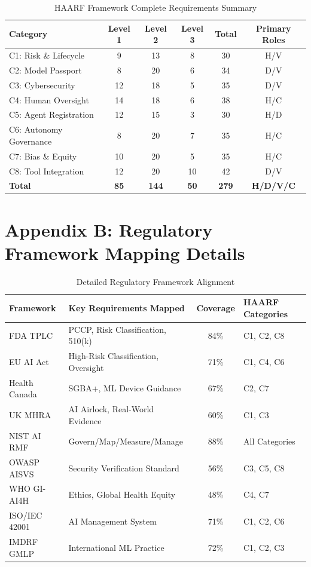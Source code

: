 \documentclass[11pt]{article}
\begin{document}
\begin{table}[H]
\centering
\footnotesize
\caption{HAARF Framework Complete Requirements Summary}
\begin{tabular}{|l|c|c|c|c|c|}
\hline
\textbf{Category} & \textbf{Level 1} & \textbf{Level 2} & \textbf{Level 3} & \textbf{Total} & \textbf{Primary Roles} \\
\hline
C1: Risk \& Lifecycle & 9 & 13 & 8 & 30 & H/V \\
C2: Model Passport & 8 & 20 & 6 & 34 & D/V \\
C3: Cybersecurity & 12 & 18 & 5 & 35 & D/V \\
C4: Human Oversight & 14 & 18 & 6 & 38 & H/C \\
C5: Agent Registration & 12 & 15 & 3 & 30 & H/D \\
C6: Autonomy Governance & 8 & 20 & 7 & 35 & H/C \\
C7: Bias \& Equity & 10 & 20 & 5 & 35 & H/C \\
C8: Tool Integration & 12 & 20 & 10 & 42 & D/V \\
\hline
\textbf{Total} & \textbf{85} & \textbf{144} & \textbf{50} & \textbf{279} & \textbf{H/D/V/C} \\
\hline
\end{tabular}
\end{table}

\section*{Appendix B: Regulatory Framework Mapping Details}

\begin{table}[H]
\centering
\footnotesize
\caption{Detailed Regulatory Framework Alignment}
\begin{tabular}{|l|l|c|l|}
\hline
\textbf{Framework} & \textbf{Key Requirements Mapped} & \textbf{Coverage} & \textbf{HAARF Categories} \\
\hline
FDA TPLC & PCCP, Risk Classification, 510(k) & 84\% & C1, C2, C8 \\
EU AI Act & High-Risk Classification, Oversight & 71\% & C1, C4, C6 \\
Health Canada & SGBA+, ML Device Guidance & 67\% & C2, C7 \\
UK MHRA & AI Airlock, Real-World Evidence & 60\% & C1, C3 \\
NIST AI RMF & Govern/Map/Measure/Manage & 88\% & All Categories \\
OWASP AISVS & Security Verification Standard & 56\% & C3, C5, C8 \\
WHO GI-AI4H & Ethics, Global Health Equity & 48\% & C4, C7 \\
ISO/IEC 42001 & AI Management System & 71\% & C1, C2, C6 \\
IMDRF GMLP & International ML Practice & 72\% & C1, C2, C3 \\
\hline
\end{tabular}
\end{table}
\end{document}
